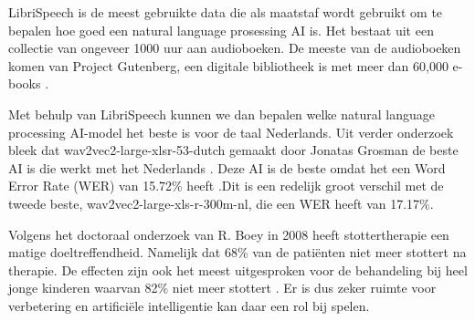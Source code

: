 LibriSpeech is de meest gebruikte data die als maatstaf wordt gebruikt om te bepalen hoe goed een natural language prosessing AI is. Het bestaat uit een collectie van ongeveer 1000 uur aan audioboeken. De meeste van de audioboeken komen van Project Gutenberg, een digitale bibliotheek is met meer dan 60,000 e-books \autocite{Han2019}.\par

Met behulp van LibriSpeech kunnen we dan bepalen welke natural language processing AI-model het beste is voor de taal Nederlands. Uit verder onderzoek bleek dat wav2vec2-large-xlsr-53-dutch gemaakt door Jonatas Grosman de beste AI is die werkt met het Nederlands \autocite{JonatasGrosman2022}. Deze AI is de beste omdat het een Word Error Rate (WER) van 15.72\% heeft .Dit is een redelijk groot verschil met de tweede beste, wav2vec2-large-xls-r-300m-nl, die een WER heeft van 17.17\%.\par

Volgens het doctoraal onderzoek van R. Boey in 2008 heeft stottertherapie een matige doeltreffendheid. Namelijk dat 68\% van de patiënten niet meer stottert na therapie. De effecten zijn ook het meest uitgesproken voor de behandeling bij heel jonge kinderen waarvan 82\% niet meer stottert \textcite{Boey2008}. Er is dus zeker ruimte voor verbetering en artificiële intelligentie kan daar een rol  bij spelen. 

